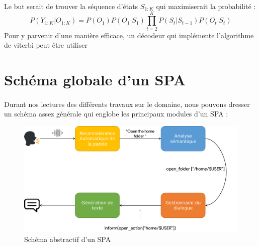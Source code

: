 	\par
	Le but serait de trouver la séquence d'états $S_{1:K}$ qui maximiserait la probabilité \cite{hmm_intro} : 
	\begin{equation}
		P(Y_{1:K} | O_{1:K}) = P(O_1)P(O_1|S_1)\prod_{t=2}^{K}P(S_t|S_{t-1})P(O_t|S_t) 
	\end{equation}
	\newpage
	Pour y parvenir d'une manière efficace, un décodeur qui implémente l'algorithme de viterbi peut être utiliser \cite{viterbi,viterbi_hmm}
\section{Schéma globale d'un SPA}
	\paragraph{}
	Durant nos lectures des différents travaux sur le domaine, nous pouvons dresser un schéma assez générale qui englobe les principaux modules d'un SPA : 
	\begin{figure}[H]
		\centering
		\includegraphics[width=0.75\linewidth]{images/SPA_diagram_2.png}
		\caption{Schéma abstractif d'un SPA \cite{spa_arch}}
		\label{spa_diagram}
	\end{figure}
